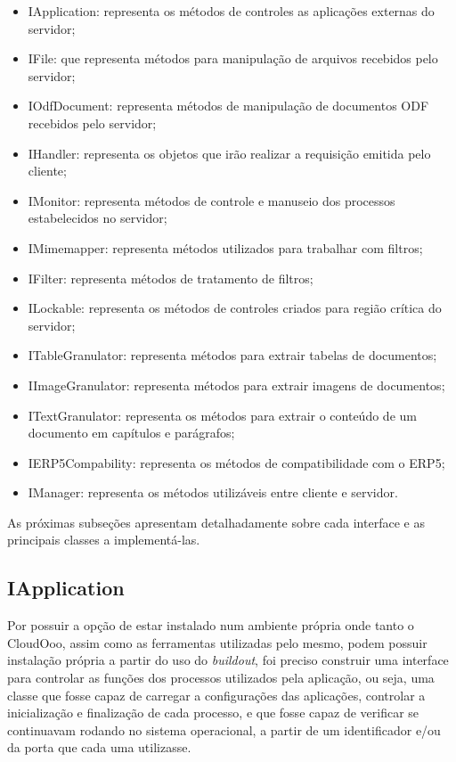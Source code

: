 \begin{itemize}
    \item{IApplication: representa os métodos de controles as aplicações externas do servidor;}
    \item{IFile: que representa métodos para manipulação de arquivos recebidos pelo servidor;}
    \item{IOdfDocument: representa métodos de manipulação de documentos ODF recebidos pelo servidor;}
    \item{IHandler: representa os objetos que irão realizar a requisição emitida pelo cliente;}
    \item{IMonitor: representa métodos de controle e manuseio dos processos estabelecidos no servidor;}
    \item{IMimemapper: representa métodos utilizados para trabalhar com filtros;}
    \item{IFilter: representa métodos de tratamento de filtros;}
    \item{ILockable: representa os métodos de controles criados para região crítica do servidor;}
    \item{ITableGranulator: representa métodos para extrair tabelas de documentos;}
    \item{IImageGranulator: representa métodos para extrair imagens de documentos;}
    \item{ITextGranulator: representa os métodos para extrair o conteúdo de um documento em capítulos e parágrafos;}
    \item{IERP5Compability: representa os métodos de compatibilidade com o ERP5;}
    \item{IManager: representa os métodos utilizáveis entre cliente e servidor.}
\end{itemize}

As próximas subseções apresentam detalhadamente sobre cada interface e as principais classes a implementá-las.

\subsection{IApplication}

Por possuir a opção de estar instalado num ambiente própria onde tanto o CloudOoo, assim como as ferramentas utilizadas pelo mesmo, podem possuir instalação própria a partir do uso do \textit{buildout}, foi preciso construir uma interface para controlar as funções dos processos utilizados pela aplicação, ou seja, uma classe que fosse capaz de carregar a configurações das aplicações, controlar a inicialização e finalização de cada processo, e que fosse capaz de verificar se continuavam rodando no sistema operacional, a partir de um identificador e/ou da porta que cada uma utilizasse.

